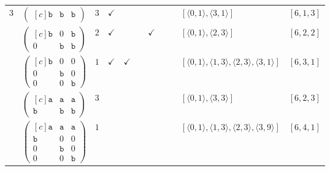 \documentclass[12pt]{article}
\theoremstyle{definition}
\theoremstyle{plain}
\begin{document}
{\begin{longtable}{@{}cYcccccccZc@{}}
\midrule[\heavyrulewidth]

$3$
& $\begin{pmatrix*}[c]
\mathtt{b}   &  \mathtt{b}    &  \mathtt{b}
\end{pmatrix*}$
& $3$
& $\checkmark$
&
&
&
&
&
& $[\langle0,1\rangle,\allowbreak\langle3,1\rangle]$
& $[6,1,3]$  \\

\cmidrule(lr){2-11}

& $\begin{pmatrix*}[c]
\mathtt{b}   &  0  &   \mathtt{b}   \\
0  &   \mathtt{b}    &  \mathtt{b}
\end{pmatrix*}$
& $2$
& $\checkmark$
&
&
& $\checkmark$
&
&
& $[\langle0,1\rangle,\allowbreak\langle2,3\rangle]$
& $[6,2,2]$ \\

\cmidrule(lr){2-11}

& $\begin{pmatrix*}[c]
\mathtt{b}   &  0  &  0   \\
0  &   \mathtt{b}    &  0   \\
0  &  0  &  \mathtt{b}
\end{pmatrix*}$
& $1$
& $\checkmark$
& $\checkmark$
&
&
&
&
& $[\langle0,1\rangle,\allowbreak\langle1,3\rangle,\allowbreak\langle2,3\rangle,\allowbreak\langle3,1\rangle]$
& $[6,3,1]$ \\

\cmidrule(lr){2-11}

& $\begin{pmatrix*}[c]
\mathtt{a}   &  \mathtt{a}  &   \mathtt{a}   \\
\mathtt{b}  &   \mathtt{b}    &  \mathtt{b}
\end{pmatrix*}$
& $3$
&
&
&
&
&
&
& $[\langle0,1\rangle,\allowbreak\langle3,3\rangle]$
& $[6,2,3]$     \\

\cmidrule(lr){2-11}

& $\begin{pmatrix*}[c]
\mathtt{a}   &  \mathtt{a}  &   \mathtt{a}   \\
\mathtt{b}  &   0    &  0    \\
0  &  \mathtt{b}  &  0  \\
0  &  0  &  \mathtt{b}
\end{pmatrix*}$
& $1$
&
&
&
&
&
&
& $[\langle0,1\rangle,\allowbreak\langle1,3\rangle,\allowbreak\langle2,3\rangle,\allowbreak\langle3,9\rangle]$
& $[6,4,1]$  \\


\end{longtable}}
\end{document}

